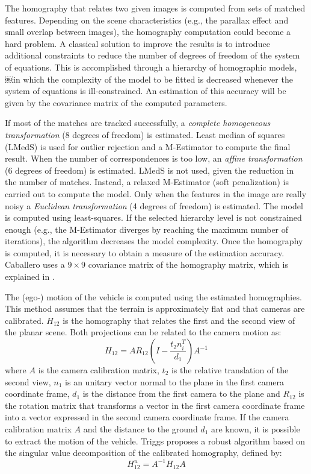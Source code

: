 The homography that relates two given images is computed from sets of matched features.
Depending on the scene characteristics (e.g., the parallax effect and small overlap between images), the homography computation could become a hard problem. 
A classical solution to improve the results is to introduce additional constraints to reduce the number of degrees of freedom of the system of equations.
This is accomplished through a hierarchy of homographic models, ￼in which the complexity of the model to be fitted is decreased whenever the system of equations is ill-constrained.
An estimation of this accuracy will be given by the covariance matrix of the computed parameters.

If most of the matches are tracked successfully, a \textit{complete homogeneous transformation} (8 degrees of freedom) is estimated.
Least median of squares (LMedS) is used for outlier rejection and a M-Estimator  \cite{zhang1997parameter} to compute the final result.
When the number of correspondences is too low, an \textit{affine transformation} (6 degrees of freedom) is estimated.
LMedS is not used, given the reduction in the number of matches.
Instead, a relaxed M-Estimator (soft penalization) is carried out to compute the model.
Only when the features in the image are really noisy a \textit{Euclidean transformation} (4 degrees of freedom) is estimated.
The model is computed using least-squares.
If the selected hierarchy level is not constrained enough (e.g., the M-Estimator diverges by reaching the maximum number of iterations), the algorithm decreases the model complexity.
Once the homography is computed, it is necessary to obtain a measure of the estimation accuracy.
Caballero uses a $9 \times 9$ covariance matrix of the homography matrix, which is explained in \cite{Hartley2004}.

The (ego-) motion of the vehicle is computed using the estimated homographies.
This method assumes that the terrain is approximately flat and that cameras are calibrated.
$H_{12}$ is the homography that relates the first and the second view of the planar scene.
Both projections can be related to the camera motion as:
\begin{equation}
H_{12} = AR_{12}(I - \frac{t_2n_i^T}{d_1})A^{-1}
\end{equation}
where $A$ is the camera calibration matrix, $t_2$ is the relative translation of the second view, $n_1$ is an unitary vector normal to the plane in the first camera coordinate frame, $d_1$ is the distance from the first camera to the plane and $R_{12}$ is the rotation matrix that transforms a vector in the first camera coordinate frame into a vector expressed in the second camera coordinate frame.
If the camera calibration matrix $A$ and the distance to the ground $d_1$ are known, it is possible to extract the motion of the vehicle.
Triggs \cite{triggs1998autocalibration} proposes a robust algorithm based on the singular value decomposition of the calibrated homography, defined by:
\begin{equation}
H_{12}^{u} = A^{-1} H_{12} A
\end{equation}

